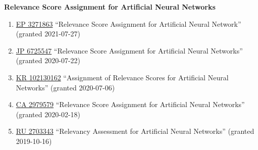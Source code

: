 \documentclass[10pt,a4paper]{article} %
\begin{document}

\newcommand{\patentref}[5]{\href{#4}{#1 #2} ``#3'' (granted #5)}
\headedsection %
{\bf Relevance Score Assignment for Artificial Neural Networks}
{
    \begin{enumerate}
        \item [] \patentref{EP}
                           {3271863}
                           {Relevance Score Assignment for Artificial Neural Network}
                           {https://patents.google.com/patent/EP3271863A1/en}
                           {2021-07-27}

        \item [] \patentref{JP}
                           {6725547}
                           {Relevance Score Assignment for Artificial Neural Networks}
                           {https://patentimages.storage.googleapis.com/91/ba/cc/36792436528537/JP6725547B2.pdf}
                           {2020-07-22}

        \item [] \patentref{KR}
                           {102130162}
                           {Assignment of Relevance Scores for Artificial Neural Networks}
                           {https://patentimages.storage.googleapis.com/80/b5/17/210f687345bb31/KR102130162B1.pdf}
                           {2020-07-06}

        \item [] \patentref{CA}
                           {2979579}
                           {Relevance Score Assignment for Artificial Neural Networks}
                           {https://patents.google.com/patent/CA2979579A1/en}
                           {2020-02-18}

        \item [] \patentref{RU}
                           {2703343}
                           {Relevancy Assessment for Artificial Neural Networks}
                           {https://patentimages.storage.googleapis.com/8d/ce/b5/70ef43a6d0f6e5/RU2703343C2.pdf}
                           {2019-10-16}
    \end{enumerate}
}

\end{document}

